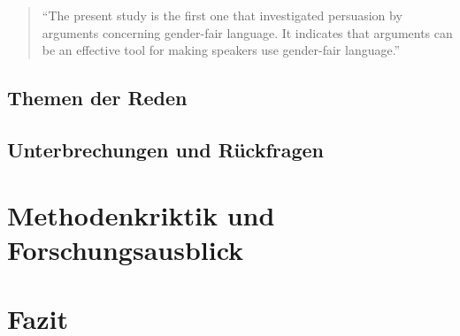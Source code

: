 \documentclass[12pt, 
    twoside=false, 
    bibliography=totoc, 
    numbers=endperiod, 
    headings=normal, 
    toc=chapterentrydotfill
    ]{scrbook}
\begin{document}
\begin{quote}
\enquote {The present study is the first one that investigated persuasion by arguments concerning gender-fair language. It indicates that arguments can be an effective tool for making speakers use gender-fair language.} \parencite[556]{koeser_2014}
\end{quote} 

\section{Themen der Reden}

\section{Unterbrechungen und Rückfragen}

\chapter{Methodenkriktik und Forschungsausblick}

\chapter{Fazit}

\printbibliography[title={Literaturverzeichnis}]
\end{document}
